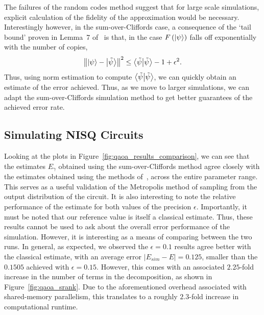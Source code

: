 The failures of the random codes method  suggest that for large scale simulations, explicit calculation of the fidelity of the approximation would be necessary. Interestingly however, in the sum-over-Cliffords case, a consequence of the `tail bound' proven in Lemma~7 of~\cite{Bravyi2018} is that, in the case $F\left(\ket{\psi}\right)$ falls off exponentially with the number of copies,
\begin{equation}
\norm{\ket{\psi}-\ket{\tilde{\psi}}}^{2} \leq \braket{\tilde{\psi}} -1 + \epsilon^{2}.
\end{equation}
Thus, using norm estimation to compute $\braket{\tilde{\psi}}$, we can quickly obtain an estimate of the error achieved. Thus, as we move to larger simulations, we can adapt the sum-over-Cliffords simulation method to get better guarantees of the achieved error rate.
\subsection{Simulating NISQ Circuits}
Looking at the plots in Figure~\ref{fig:qaoa_results_comparison}, we can see that the estimates $E_{\gamma}$ obtained using the sum-over-Cliffords method agree closely with the estimates obtained using the methods of~\cite{VandenNest2009}, across the entire parameter range. This serves as a useful validation of the Metropolis method of sampling from the output distribution of the circuit. It is also interesting to note the relative performance of the estimate for both values of the precision $\epsilon$. Importantly, it must be noted that our reference value is itself a classical estimate. Thus, these results cannot be used to ask about the overall error performance of the simulation. However, it is interesting as a means of comparing between the two runs. In general, as expected, we observed the $\epsilon=0.1$ results agree better with the classical estimate, with an average error $\left|E_{sim}-E\right|=0.125$, smaller than the $0.1505$ achieved with $\epsilon=0.15$. However, this comes with an associated $2.25$-fold increase in the number of terms in the decomposition, as shown in Figure~\ref{fig:qaoa_srank}. Due to the aforementioned overhead associated with shared-memory parallelism, this translates to a roughly $2.3$-fold increase in computational runtime.\par
